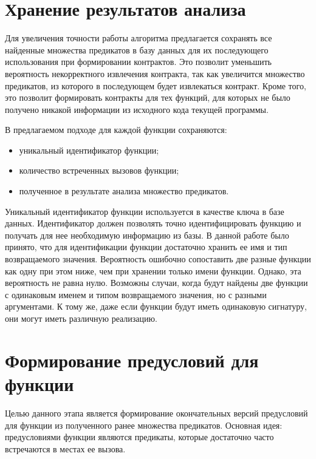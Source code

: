 \section{Хранение результатов анализа}
\label{section:saving}
Для увеличения точности работы алгоритма предлагается сохранять все найденные множества предикатов в базу данных для их последующего использования при формировании контрактов. Это позволит уменьшить вероятность некорректного извлечения контракта, так как увеличится множество предикатов, из которого в последующем будет извлекаться контракт. Кроме того, это позволит формировать контракты для тех функций, для которых не было получено никакой информации из исходного кода текущей программы.

В предлагаемом подходе для каждой функции сохраняются:
\begin{itemize}
\item уникальный идентификатор функции;
\item количество встреченных вызовов функции;
\item полученное в результате анализа множество предикатов.
\end{itemize}

Уникальный идентификатор функции используется в качестве ключа в базе данных. Идентификатор должен позволять точно идентифицировать функцию и получать для нее необходимую информацию из базы. В данной работе было принято, что для идентификации функции достаточно хранить ее имя и тип возвращаемого значения. Вероятность ошибочно сопоставить две разные функции как одну при этом ниже, чем при хранении только имени функции. Однако, эта вероятность не равна нулю. Возможны случаи, когда будут найдены две функции с одинаковым именем и типом возвращаемого значения, но с разными аргументами. К тому же, даже если функции будут иметь одинаковую сигнатуру, они могут иметь различную реализацию.

\section{Формирование предусловий для функции}
\label{section:merging}
Целью данного этапа является формирование окончательных версий предусловий для функции из полученного ранее множества предикатов. Основная идея: предусловиями функции являются предикаты, которые достаточно часто встречаются в местах ее вызова. 


